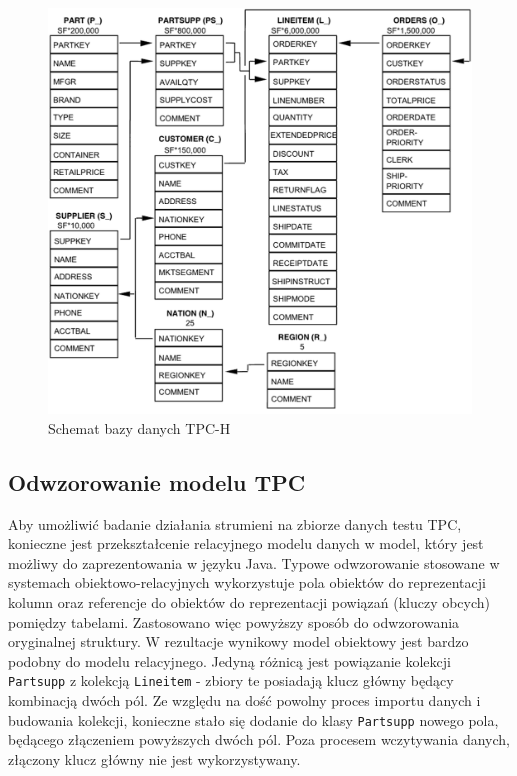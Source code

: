 \documentclass[12pt,twoside,openright]{extarticle}
\begin{document}
\begin{figure}
\centering
\includegraphics[width=14cm]{tpc-schema.png}
\caption{Schemat bazy danych TPC-H}
\label{fig:tpcschema}
\end{figure}


\subsection{Odwzorowanie modelu TPC}

    Aby umożliwić badanie działania strumieni na zbiorze danych testu TPC, konieczne jest przekształcenie relacyjnego modelu danych w model, który jest możliwy do zaprezentowania w języku Java. Typowe odwzorowanie stosowane w systemach obiektowo-relacyjnych wykorzystuje pola obiektów do reprezentacji kolumn oraz referencje do obiektów do reprezentacji powiązań (kluczy obcych) pomiędzy tabelami. Zastosowano więc powyższy sposób do odwzorowania oryginalnej struktury. W rezultacje wynikowy model obiektowy jest bardzo podobny do modelu relacyjnego. Jedyną różnicą jest powiązanie kolekcji \texttt{Partsupp} z kolekcją \texttt{Lineitem} - zbiory te posiadają klucz główny będący kombinacją dwóch pól. Ze względu na dość powolny proces importu danych i budowania kolekcji, konieczne stało się dodanie do klasy \texttt{Partsupp} nowego pola, będącego złączeniem powyższych dwóch pól. Poza procesem wczytywania danych, złączony klucz główny nie jest wykorzystywany.
\end{document}

